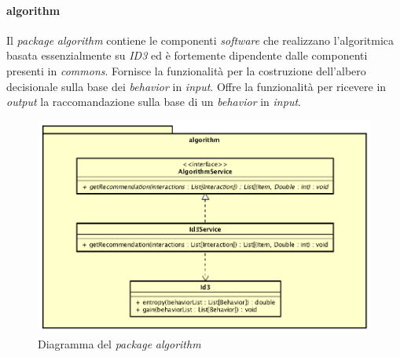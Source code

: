 \paragraph*{algorithm}
Il \emph{package} \emph{algorithm} contiene le componenti \emph{software} che realizzano l'algoritmica basata essenzialmente su \emph{ID3} ed è fortemente dipendente dalle componenti presenti in \emph{commons}. Fornisce la funzionalità per la costruzione dell'albero decisionale sulla base dei \emph{behavior} in \emph{input}. Offre la funzionalità per ricevere in \emph{output} la raccomandazione sulla base di un \emph{behavior} in \emph{input}.
\begin{figure}[h]
\centering
\includegraphics[scale=0.30]{immagini/algorithm}
\caption{Diagramma del \emph{package} \emph{algorithm}}
\label{fig:pack-algorithm}
\end{figure}
